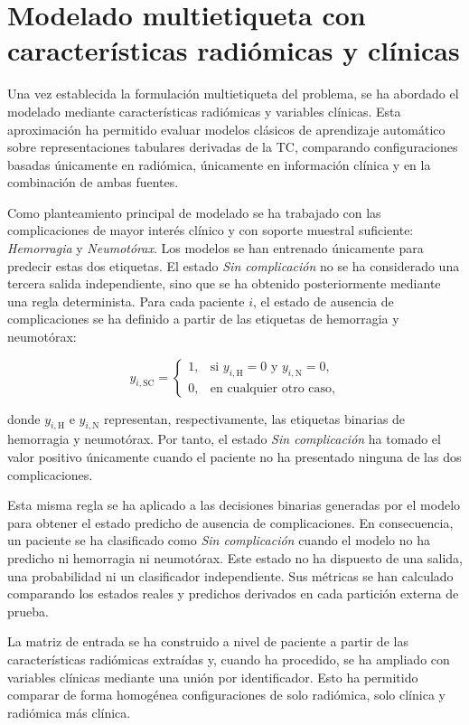 \section{Modelado multietiqueta con características radiómicas y clínicas}

Una vez establecida la formulación multietiqueta del problema, se ha abordado el modelado mediante características radiómicas y variables clínicas. Esta aproximación ha permitido evaluar modelos clásicos de aprendizaje automático sobre representaciones tabulares derivadas de la TC, comparando configuraciones basadas únicamente en radiómica, únicamente en información clínica y en la combinación de ambas fuentes.

Como planteamiento principal de modelado se ha trabajado con las complicaciones de mayor interés clínico y con soporte muestral suficiente: \textit{Hemorragia} y \textit{Neumotórax}. Los modelos se han entrenado únicamente para predecir estas dos etiquetas. El estado \textit{Sin complicación} no se ha considerado una tercera salida independiente, sino que se ha obtenido posteriormente mediante una regla determinista. Para cada paciente \(i\), el estado de ausencia de complicaciones se ha definido a partir de las etiquetas de hemorragia y neumotórax:

\[
y_{i,\mathrm{SC}} =
\begin{cases}
1, & \text{si } y_{i,\mathrm{H}}=0 \text{ y } y_{i,\mathrm{N}}=0,\\
0, & \text{en cualquier otro caso},
\end{cases}
\]

donde \(y_{i,\mathrm{H}}\) e \(y_{i,\mathrm{N}}\) representan, respectivamente, las etiquetas binarias de hemorragia y neumotórax. Por tanto, el estado \textit{Sin complicación} ha tomado el valor positivo únicamente cuando el paciente no ha presentado ninguna de las dos complicaciones.

Esta misma regla se ha aplicado a las decisiones binarias generadas por el modelo para obtener el estado predicho de ausencia de complicaciones. En consecuencia, un paciente se ha clasificado como \textit{Sin complicación} cuando el modelo no ha predicho ni hemorragia ni neumotórax. Este estado no ha dispuesto de una salida, una probabilidad ni un clasificador independiente. Sus métricas se han calculado comparando los estados reales y predichos derivados en cada partición externa de prueba.

La matriz de entrada se ha construido a nivel de paciente a partir de las características radiómicas extraídas y, cuando ha procedido, se ha ampliado con variables clínicas mediante una unión por identificador. Esto ha permitido comparar de forma homogénea configuraciones de solo radiómica, solo clínica y radiómica más clínica.

